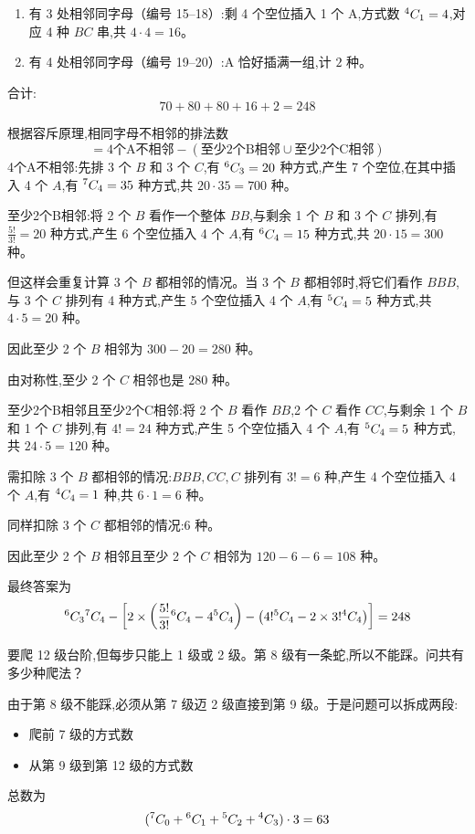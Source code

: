 \begin{questions}
\begin{solution}
\begin{enumerate}
            \item 有 3 处相邻同字母（编号 15--18）:剩 4 个空位插入 1 个 A,方式数 ${}^{4}C_{1}=4$,对应 4 种 $BC$ 串,共 $4\cdot4=16$。
            \item 有 4 处相邻同字母（编号 19--20）:A 恰好插满一组,计 $2$ 种。
        \end{enumerate}
        合计:
        \[
        70+80+80+16+2=248
        \]
    \end{solution}
    \begin{solution}
        根据容斥原理,相同字母不相邻的排法数
        \[
        = \text{4个A不相邻} - (\text{至少2个B相邻} \cup \text{至少2个C相邻})
        \]
        4个A不相邻:先排 3 个 $B$ 和 3 个 $C$,有 ${}^{6}C_{3}=20$ 种方式,产生 7 个空位,在其中插入 4 个 $A$,有 ${}^{7}C_{4}=35$ 种方式,共 $20 \cdot 35=700$ 种。

        至少2个B相邻:将 2 个 $B$ 看作一个整体 $BB$,与剩余 1 个 $B$ 和 3 个 $C$ 排列,有 $\frac{5!}{3!}=20$ 种方式,产生 6 个空位插入 4 个 $A$,有 ${}^{6}C_{4}=15$ 种方式,共 $20 \cdot 15=300$ 种。

        但这样会重复计算 3 个 $B$ 都相邻的情况。当 3 个 $B$ 都相邻时,将它们看作 $BBB$,与 3 个 $C$ 排列有 4 种方式,产生 5 个空位插入 4 个 $A$,有 ${}^{5}C_{4}=5$ 种方式,共 $4 \cdot 5=20$ 种。

        因此至少 2 个 $B$ 相邻为 $300-20=280$ 种。

        由对称性,至少 2 个 $C$ 相邻也是 $280$ 种。

        至少2个B相邻且至少2个C相邻:将 2 个 $B$ 看作 $BB$,2 个 $C$ 看作 $CC$,与剩余 1 个 $B$ 和 1 个 $C$ 排列,有 $4!=24$ 种方式,产生 5 个空位插入 4 个 $A$,有 ${}^{5}C_{4}=5$ 种方式,共 $24 \cdot 5=120$ 种。

        需扣除 3 个 $B$ 都相邻的情况:$BBB,CC,C$ 排列有 $3!=6$ 种,产生 4 个空位插入 4 个 $A$,有 ${}^{4}C_{4}=1$ 种,共 $6 \cdot 1=6$ 种。

        同样扣除 3 个 $C$ 都相邻的情况:$6$ 种。

        因此至少 2 个 $B$ 相邻且至少 2 个 $C$ 相邻为 $120-6-6=108$ 种。

        最终答案为 
        \[
        {}^{6}C_{3}{}^{7}C_{4} - \left[2 \times \left(\frac{5!}{3!}{}^{6}C_{4}-4{}^{5}C_{4}\right) - \left(4!{}^{5}C_{4}-2 \times 3!{}^{4}C_{4}\right)\right]=248
        \]
    \end{solution}

    \question 要爬 12 级台阶,但每步只能上 1 级或 2 级。第 8 级有一条蛇,所以不能踩。问共有多少种爬法？
    \begin{solution}
        由于第 8 级不能踩,必须从第 7 级迈 2 级直接到第 9 级。于是问题可以拆成两段:
        \begin{itemize}
            \item 爬前 7 级的方式数
            \item 从第 9 级到第 12 级的方式数
        \end{itemize}
        总数为
        \[
        ({}^{7}C_{0}+{}^{6}C_{1}+{}^{5}C_{2}+{}^{4}C_{3})\cdot 3=63
        \]
    \end{solution}


\end{questions}
